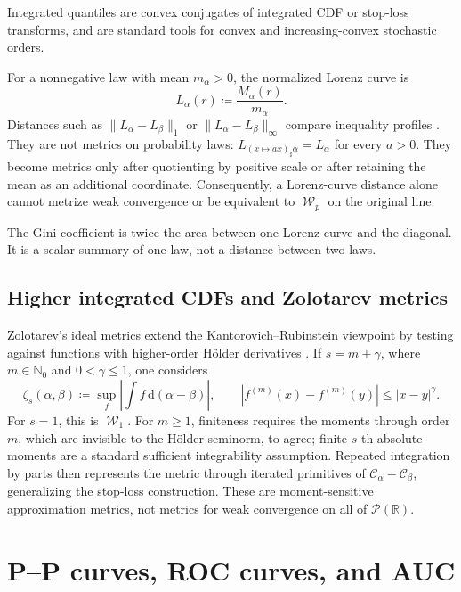 \documentclass[11pt]{article}
\newcommand{\RR}{\mathbb R}
\newcommand{\NN}{\mathbb N}
\newcommand{\Pp}{\mathcal P}
\renewcommand{\d}{\,\mathrm d}
\newcommand{\al}{\alpha}
\newcommand{\be}{\beta}
\newcommand{\Cc}{\mathcal C}
\newcommand{\cumul}[1]{\Cc_{#1}}
\DeclareMathOperator{\Wass}{\mathcal W}
\newcommand{\eqdef}{\coloneqq}
\begin{document}
Integrated quantiles are convex conjugates of integrated CDF or stop-loss
transforms, and are standard tools for convex and increasing-convex stochastic
orders.

For a nonnegative law with mean $m_\al>0$, the normalized Lorenz curve is
\begin{equation}\label{eq:lorenz}
 L_\al(r)\eqdef\frac{M_\al(r)}{m_\al}.
\end{equation}
Distances such as $\|L_\al-L_\be\|_1$ or
$\|L_\al-L_\be\|_\infty$ compare inequality profiles
\cite{Lorenz1905,Gastwirth1971}.  They are not metrics on probability laws:
$L_{(x\mapsto ax)_\sharp\al}=L_\al$ for every $a>0$.  They become
metrics only after quotienting by positive scale or after retaining the mean
as an additional coordinate.  Consequently, a Lorenz-curve distance alone
cannot metrize weak convergence or be equivalent to $\Wass_p$ on the original
line.

The Gini coefficient is twice the area between one Lorenz curve and the
diagonal.  It is a scalar summary of one law, not a distance between two laws.

\subsection{Higher integrated CDFs and Zolotarev metrics}

Zolotarev's ideal metrics extend the Kantorovich--Rubinstein viewpoint by
testing against functions with higher-order H\"older derivatives
\cite{Zolotarev1978}.  If $s=m+\gamma$, where $m\in\NN_0$ and
$0<\gamma\leq1$, one considers
\begin{equation}\label{eq:zolotarev}
 \zeta_s(\al,\be)
 \eqdef\sup_f\left|\int f\d(\al-\be)\right|,
 \qquad
 |f^{(m)}(x)-f^{(m)}(y)|\leq|x-y|^\gamma.
\end{equation}
For $s=1$, this is $\Wass_1$.  For $m\geq1$, finiteness requires the moments
through order $m$, which are invisible to the H\"older seminorm, to agree;
finite $s$-th absolute moments are a standard sufficient integrability
assumption.  Repeated integration by parts then represents the metric through
iterated primitives of $\cumul{\al}-\cumul{\be}$, generalizing the stop-loss
construction.  These are moment-sensitive approximation metrics, not metrics
for weak convergence on all of $\Pp(\RR)$.

\section{P--P curves, ROC curves, and AUC}
\end{document}
